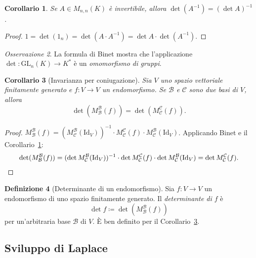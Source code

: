 \documentclass[11pt, a4paper]{book}
\theoremstyle{definition}
\newtheorem{definizione}{Definizione}[section]
\theoremstyle{plain}
\newtheorem{corollario}[definizione]{Corollario}
\theoremstyle{remark}
\newtheorem{osservazione}[definizione]{Osservazione}
\newcommand{\Id}{\mathrm{Id}}
\newcommand{\GL}{\mathrm{GL}}
\begin{document}
\begin{corollario}
\label{cor:det-inversa}
Se $A \in M_{n,n}(K)$ è invertibile, allora $\det(A^{-1}) = (\det A)^{-1}$.
\end{corollario}

\begin{proof}
$1 = \det(1_n) = \det(A \cdot A^{-1}) = \det A \cdot \det(A^{-1})$.
\end{proof}

\begin{osservazione}
La formula di Binet mostra che l'applicazione $\det \colon \GL_n(K) \to K^*$ è un \emph{omomorfismo di gruppi}.
\end{osservazione}

\begin{corollario}[Invarianza per coniugazione]
\label{cor:det-coniugazione}
Sia $V$ uno spazio vettoriale finitamente generato e $f \colon V \to V$ un endomorfismo. Se $\mathcal{B}$ e $\mathcal{C}$ sono due basi di $V$, allora
\[
  \det(M^{\mathcal{B}}_{\mathcal{B}}(f)) = \det(M^{\mathcal{C}}_{\mathcal{C}}(f)).
\]
\end{corollario}

\begin{proof}
$M^{\mathcal{B}}_{\mathcal{B}}(f) = (M^{\mathcal{B}}_{\mathcal{C}}(\Id_V))^{-1}\cdot M^{\mathcal{C}}_{\mathcal{C}}(f) \cdot M^{\mathcal{B}}_{\mathcal{C}}(\Id_V)$. Applicando Binet e il Corollario~\ref{cor:det-inversa}:
\[
  \det(M^{\mathcal{B}}_{\mathcal{B}}(f)) = (\det M^{\mathcal{B}}_{\mathcal{C}}(\Id_V))^{-1}\cdot\det M^{\mathcal{C}}_{\mathcal{C}}(f)\cdot\det M^{\mathcal{B}}_{\mathcal{C}}(\Id_V) = \det M^{\mathcal{C}}_{\mathcal{C}}(f). \qedhere
\]
\end{proof}

\begin{defbox}
\begin{definizione}[Determinante di un endomorfismo]
Sia $f \colon V \to V$ un endomorfismo di uno spazio finitamente generato. Il \emph{determinante di $f$} è
\[
  \det f \coloneqq \det(M^{\mathcal{B}}_{\mathcal{B}}(f))
\]
per un'arbitraria base $\mathcal{B}$ di $V$. È ben definito per il Corollario~\ref{cor:det-coniugazione}.
\end{definizione}
\end{defbox}

\subsection{Sviluppo di Laplace}
\end{document}
